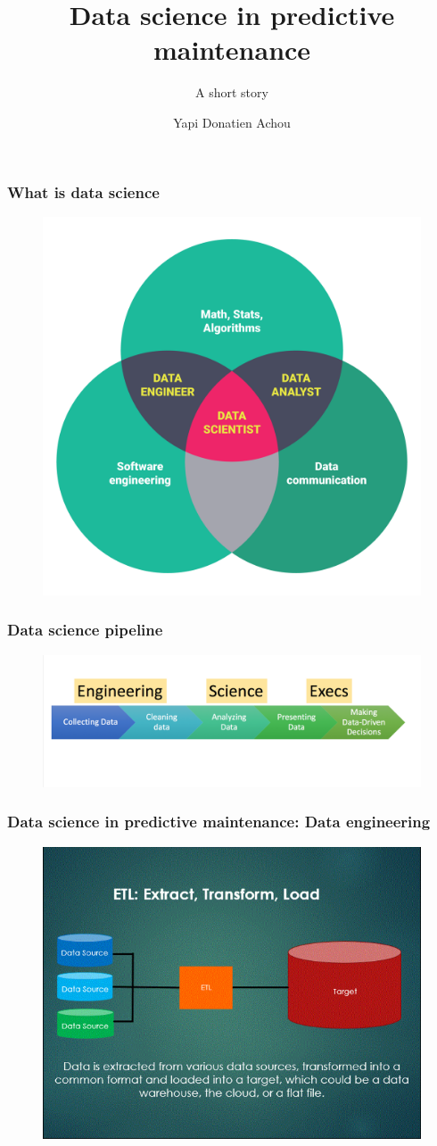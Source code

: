 \documentclass{beamer}
\title[Karsten Moholt Digital] %
 {Data science in predictive maintenance }
\subtitle{A short story}
\author[] %
 {Yapi Donatien Achou}
\begin{document}
 
\frame{\titlepage}
 
\begin{frame}
\frametitle{What is data science}
\begin{figure}[H]
	\centering
	\includegraphics[width=0.5\linewidth]{datascience2}
\end{figure}
\end{frame}
\begin{frame}
	\frametitle{Data science pipeline}
	\begin{figure}[H]
		\centering
		\includegraphics[width=1.1\linewidth]{pipeline}
	\end{figure}
\end{frame}
\begin{frame}
	\frametitle{Data science in predictive maintenance: Data engineering}
	\begin{figure}[H]
		\centering
		\includegraphics[width=0.55\linewidth]{etl2}
	\end{figure}
\end{frame}
\end{document}
